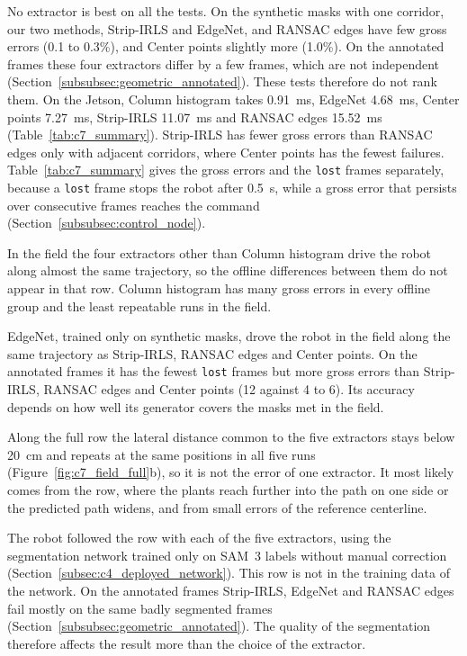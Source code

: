 No extractor is best on all the tests. On the synthetic masks with one corridor, our two methods, Strip-IRLS and EdgeNet, and RANSAC edges have few gross errors (0.1 to 0.3\%), and Center points slightly more (1.0\%). On the annotated frames these four extractors differ by a few frames, which are not independent (Section~\ref{subsubsec:geometric_annotated}). These tests therefore do not rank them. On the Jetson, Column histogram takes 0.91~ms, EdgeNet 4.68~ms, Center points 7.27~ms, Strip-IRLS 11.07~ms and RANSAC edges 15.52~ms (Table~\ref{tab:c7_summary}). Strip-IRLS has fewer gross errors than RANSAC edges only with adjacent corridors, where Center points has the fewest failures. Table~\ref{tab:c7_summary} gives the gross errors and the \texttt{lost} frames separately, because a \texttt{lost} frame stops the robot after 0.5~s, while a gross error that persists over consecutive frames reaches the command (Section~\ref{subsubsec:control_node}).

In the field the four extractors other than Column histogram drive the robot along almost the same trajectory, so the offline differences between them do not appear in that row. Column histogram has many gross errors in every offline group and the least repeatable runs in the field.

EdgeNet, trained only on synthetic masks, drove the robot in the field along the same trajectory as Strip-IRLS, RANSAC edges and Center points. On the annotated frames it has the fewest \texttt{lost} frames but more gross errors than Strip-IRLS, RANSAC edges and Center points (12 against 4 to 6). Its accuracy depends on how well its generator covers the masks met in the field.

Along the full row the lateral distance common to the five extractors stays below 20~cm and repeats at the same positions in all five runs (Figure~\ref{fig:c7_field_full}b), so it is not the error of one extractor. It most likely comes from the row, where the plants reach further into the path on one side or the predicted path widens, and from small errors of the reference centerline.

The robot followed the row with each of the five extractors, using the segmentation network trained only on SAM~3 labels without manual correction (Section~\ref{subsec:c4_deployed_network}). This row is not in the training data of the network. On the annotated frames Strip-IRLS, EdgeNet and RANSAC edges fail mostly on the same badly segmented frames (Section~\ref{subsubsec:geometric_annotated}). The quality of the segmentation therefore affects the result more than the choice of the extractor.
